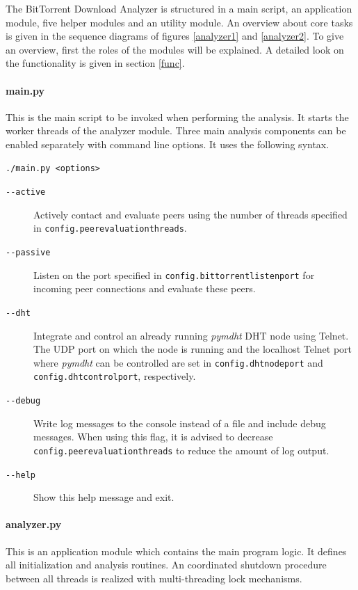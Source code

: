\documentclass[10pt, a4paper, twoside=false, headsepline]{scrbook}
\renewcommand{\_}{\origunderscore\allowbreak}
\newcommand{\config}[1]{\texttt{config.\allowbreak #1}}
\begin{document}
The BitTorrent Download Analyzer is structured in a main script, an application module, five helper modules and an utility module. An overview about core tasks is given in the sequence diagrams of figures \ref{analyzer1} and \ref{analyzer2}. To give an overview, first the roles of the modules will be explained. A detailed look on the functionality is given in section \ref{func}.

\paragraph{main.py} This is the main script to be invoked when performing the analysis. It starts the worker threads of the analyzer module. Three main analysis components can be enabled separately with command line options. It uses the following syntax.
\begin{lstlisting}
./main.py <options>
\end{lstlisting}
\begin{description}
\item[\texttt{-{}-active}] Actively contact and evaluate peers using the number of threads specified in \config{peer\_evaluation\_threads}.
\item[\texttt{-{}-passive}] Listen on the port specified in \config{bittorrent\_listen\_port} for incoming peer connections and evaluate these peers.
\item[\texttt{-{}-dht}] Integrate and control an already running \emph{pymdht} DHT node using Telnet. The UDP port on which the node is running and the localhost Telnet port where \emph{pymdht} can be controlled are set in \config{dht\_node\_port} and \config{dht\_control\_port}, respectively.
\item[\texttt{-{}-debug}] Write log messages to the console instead of a file and include debug messages. When using this flag, it is advised to decrease \config{peer\_evaluation\_threads} to reduce the amount of log output.
\item[\texttt{-{}-help}] Show this help message and exit.
\end{description}

\paragraph{analyzer.py} This is an application module which contains the main program logic. It defines all initialization and analysis routines. An coordinated shutdown procedure between all threads is realized with multi-threading lock mechanisms.
\end{document}
